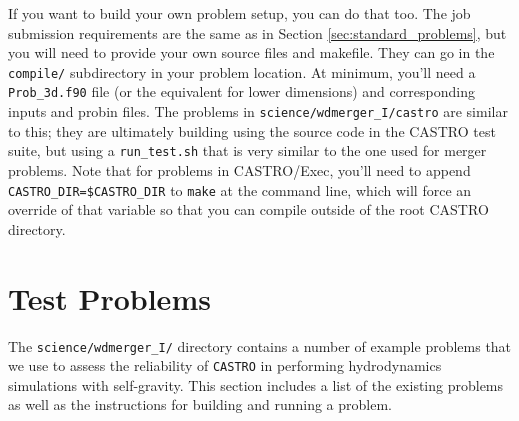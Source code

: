 \documentclass[12pt]{book}
\begin{document}
If you want to build your own problem setup, you can do that too. The job submission 
requirements are the same as in Section \ref{sec:standard_problems}, but you will need to provide 
your own source files and makefile. They can go in the \texttt{compile/} subdirectory in your problem location.
At minimum, you'll need a \texttt{Prob\_3d.f90} file (or the equivalent for lower dimensions) and
corresponding inputs and probin files. The problems in \texttt{science/wdmerger\_I/castro} are similar to this;
they are ultimately building using the source code in the CASTRO test suite, but using a
\texttt{run\_test.sh} that is very similar to the one used for merger problems. Note that for problems
in CASTRO/Exec, you'll need to append \texttt{CASTRO\_DIR=\$CASTRO\_DIR} to \texttt{make} at the
command line, which will force an override of that variable so that you can compile
outside of the root CASTRO directory.

\chapter{Test Problems}

The \texttt{science/wdmerger\_I/} directory contains a number of example problems that we use
to assess the reliability of \texttt{CASTRO} in performing hydrodynamics simulations 
with self-gravity. This section includes a list of the existing problems 
as well as the instructions for building and running a problem.
\end{document}
